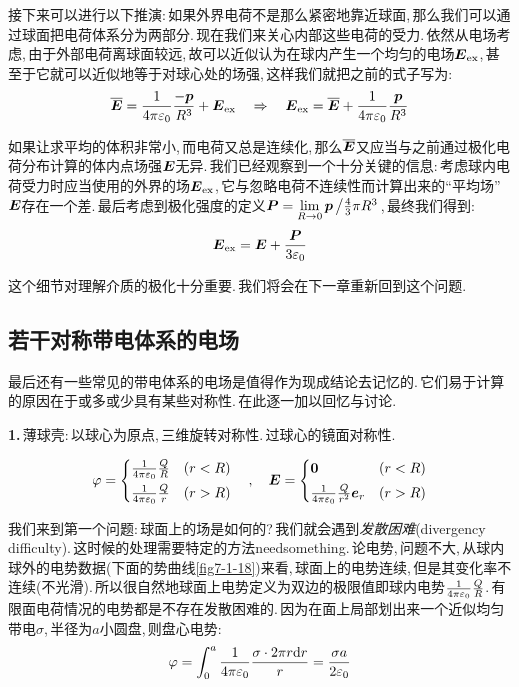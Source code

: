 接下来可以进行以下推演:\,如果外界电荷不是那么紧密地靠近球面,\,那么我们可以通过球面把电荷体系分为两部分.\,现在我们来关心内部这些电荷的受力.\,依然从电场考虑,\,由于外部电荷离球面较远,\,故可以近似认为在球内产生一个均匀的电场$\boldsymbol{E}_{\rm ex}$,\,甚至于它就可以近似地等于对球心处的场强,\,这样我们就把之前的式子写为:
\[\overline{\boldsymbol{E}}=\frac{1}{4\pi\varepsilon_0} \frac{-\boldsymbol{p}}{R^3}+\boldsymbol{E}_{\rm ex} \quad\Rightarrow \quad \boldsymbol{E}_{\rm ex}=\overline{\boldsymbol{E}}+\frac{1}{4\pi\varepsilon_0} \frac{\boldsymbol{p}}{R^3}\]

如果让求平均的体积非常小,\,而电荷又总是连续化,\,那么$\overline{\boldsymbol{E}}$又应当与之前通过极化电荷分布计算的体内点场强$\boldsymbol{E}$无异.\,我们已经观察到一个十分关键的信息:\,考虑球内电荷受力时应当使用的外界的场$\boldsymbol{E}_{\rm ex}$,\,它与忽略电荷不连续性而计算出来的``平均场''$\boldsymbol{E}$存在一个差.\,最后考虑到极化强度的定义$\boldsymbol{P}=\lim\limits_{R\to 0}\boldsymbol{p}\left/\frac{4}{3}\pi R^3\right.$,\,最终我们得到:
\[\boldsymbol{E}_{\rm ex}=\boldsymbol{E}+\frac{\boldsymbol{P}}{3\varepsilon_0}\]

这个细节对理解介质的极化十分重要.\,我们将会在下一章重新回到这个问题.

\subsection{若干对称带电体系的电场}

最后还有一些常见的带电体系的电场是值得作为现成结论去记忆的.\,它们易于计算的原因在于或多或少具有某些对称性.\,在此逐一加以回忆与讨论.

\vspace{0.3cm}
\textbf{1.}\,薄球壳:\,以球心为原点,\,三维旋转对称性.\,过球心的镜面对称性.

\[\varphi=\begin{cases} \frac{1}{4\pi\varepsilon_0} \frac{Q}{R}& (r<R) \\[3pt] \frac{1}{4\pi\varepsilon_0} \frac{Q}{r} & (r>R) \end{cases} \quad,	\quad \boldsymbol{E}=\begin{cases}  \boldsymbol{0} & (r<R) \\[3pt] \frac{1}{4\pi\varepsilon_0} \frac{Q}{r^2}\boldsymbol{e}_r & (r>R) \end{cases}\]

我们来到第一个问题:\,球面上的场是如何的?\,我们就会遇到\emph{发散困难}(divergency difficulty).\,这时候的处理需要特定的方法needsomething.\,论电势,\,问题不大,\,从球内球外的电势数据(下面的势曲线\ref{fig7-1-18})来看,\,球面上的电势连续,\,但是其变化率不连续(不光滑).\,所以很自然地球面上电势定义为双边的极限值即球内电势$\frac{1}{4\pi\varepsilon_0} \frac{Q}{R}$.\,有限面电荷情况的电势都是不存在发散困难的.\,因为在面上局部划出来一个近似均匀带电$\sigma$,\,半径为$a$小圆盘,\,则盘心电势:
\[\varphi=\int_0^a \frac{1}{4\pi\varepsilon_0} \frac{\sigma \cdot 2\pi r \textrm{d} r}{r}=\frac{\sigma a}{2\varepsilon_0}\]

